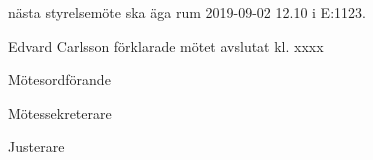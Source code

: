 \documentclass[10pt]{article}
\def\mo{Edvard Carlsson}
\def\ms{Mattias Lundström}
\def\ji{-----}
\begin{document}
\begin{paragrafer}
\begin{paragrafer}
 




\end{paragrafer}


\Mba nästa styrelsemöte ska äga rum 2019-09-02 12.10 i E:1123.






{\mo} förklarade mötet avslutat kl. xxxx
\end{paragrafer}

\hidesignfoot
\begin{signatures}{3}
\signature{\mo}{Mötesordförande}
\signature{\ms}{Mötessekreterare}
\signature{\ji}{Justerare}
\end{signatures}
\end{document}
